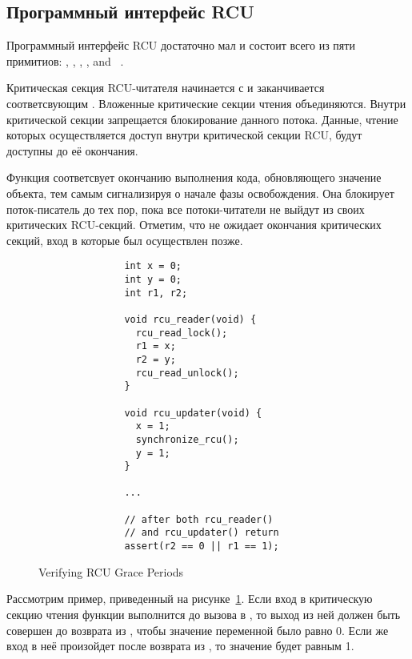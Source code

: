 \subsection{Программный интерфейс RCU} \label{sec:api_usage}
Программный интерфейс RCU достаточно мал и состоит всего из пяти примитиов:
, , ,
, and ~\cite{McKenneyOSR08}.

Критическая секция RCU-читателя начинается с 
и заканчивается соответсвующим .
Вложенные критические секции чтения объединяются.
Внутри критической секции запрещается блокирование данного потока.
Данные, чтение которых осуществляется доступ внутри критической секции RCU,
будут доступны до её окончания.

Функция  соответсвует окончанию выполнения кода,
обновляющего значение объекта, тем самым сигнализируя о начале фазы освобождения.
Она блокирует поток-писатель до тех пор, пока все потоки-читатели
не выйдут из своих критических RCU-секций.
Отметим, что  не ожидает окончания
критических секций, вход в которые был осуществлен позже.


\begin{figure}[tbp]
\centering
\footnotesize
\begin{verbatim}
               int x = 0;
               int y = 0;
               int r1, r2;

               void rcu_reader(void) {
                 rcu_read_lock();
                 r1 = x;
                 r2 = y;
                 rcu_read_unlock();
               }

               void rcu_updater(void) {
                 x = 1;
                 synchronize_rcu();
                 y = 1;
               }

               ...

               // after both rcu_reader()
               // and rcu_updater() return
               assert(r2 == 0 || r1 == 1);
\end{verbatim}
\caption{Verifying RCU Grace Periods}
\label{fig:verify_rcu_gp}
\end{figure}

Рассмотрим пример, приведенный на рисунке~\ref{fig:verify_rcu_gp}.
Если вход в критическую секцию чтения функции  выполнится до
вызова  в , то выход из ней должен быть
совершен до возврата из , чтобы значение переменной
 было равно 0. Если же вход в неё произойдет после возврата из
, то значение  будет равным 1.

